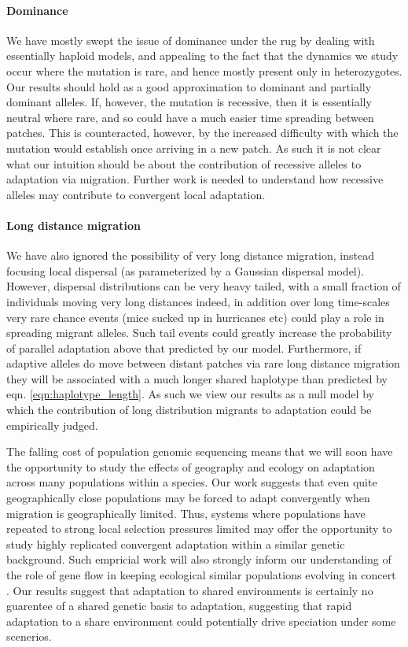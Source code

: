 \documentclass{article}
\begin{document}
\paragraph{Dominance}
We have mostly swept the issue of dominance under the rug
by dealing with essentially haploid models,
and appealing to the fact that the dynamics we study occur where the mutation is rare,
and hence mostly present only in heterozygotes. 
Our results should hold as a good approximation to dominant and
partially dominant alleles.
If, however, the mutation is recessive, then it is essentially neutral where rare,
and so could have a much easier time spreading between patches.
This is counteracted, however, by the increased difficulty with which the mutation would establish
once arriving in a new patch. As
 such it is not clear what our intuition should be about the
 contribution of recessive alleles to adaptation via migration. 
Further work is needed to understand how recessive alleles may
contribute to convergent local adaptation.

\paragraph{Long distance migration}
We have also ignored the possibility of very long distance migration,
instead focusing local dispersal (as parameterized by a Gaussian
dispersal model). However, dispersal distributions can be very heavy
tailed, with a small fraction of individuals moving very long distances indeed, in
addition over long time-scales very rare chance events (mice sucked up in
hurricanes etc) could play a role in spreading migrant alleles. Such
tail events could greatly increase the probability of parallel
adaptation above that predicted by our model. Furthermore, if
adaptive alleles do move between distant patches via rare long distance
migration they will be associated with a much longer shared haplotype than
predicted by eqn. \eqref{eqn:haplotype_length}. As such we view our
results as a null model by which the contribution of long distribution
migrants to adaptation could be empirically judged.   

The falling cost of population genomic sequencing means that we will soon have the
opportunity to study the effects of geography and ecology on
adaptation across many populations within a species. 
Our work suggests that even quite geographically close populations may
be forced to adapt convergently when migration is geographically limited. 
Thus, systems where populations have repeated to strong local
selection pressures limited may offer the opportunity to study
highly replicated convergent adaptation within a similar genetic
background.  
Such empricial work will also strongly inform our understanding of the role of gene flow in
keeping ecological similar populations evolving in concert \citep{sexton}.
Our results suggest that adaptation to shared environments is
certainly no guarentee of a shared genetic basis to adaptation, suggesting that
rapid adaptation to a share environment could potentially drive
speciation under some scenerios. 
\end{document}
